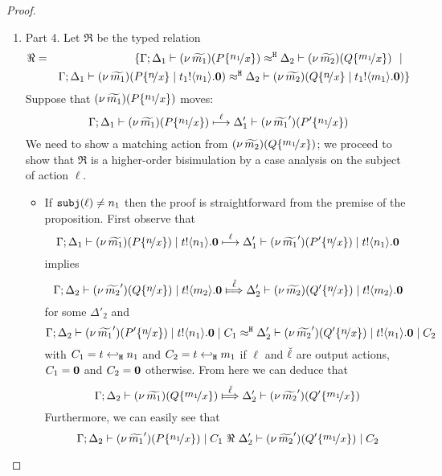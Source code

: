 \begin{proof}
\begin{enumerate}[1.]
		\item	Part 4. Let $\Re$ be the typed relation
				\begin{eqnarray*}
					\Re &=& \set{	\horel{\Gamma}{\Delta_1}{ \newsp{\widetilde{m_1}}{P \subst{n_1}{x} }}
									{\hwb}
									{\Delta_2}{ \newsp{\widetilde{m_2}}{Q \subst{m_1}{x} }} \setbar \\
						&&
									\horel{\Gamma}{\Delta_1}{ \newsp{\widetilde{m_1}}{P \subst{n}{x} \Par \bout{t_1}{n_1} \inact }}
									{\hwb}
									{\Delta_2}{ \newsp{\widetilde{m_2}}{Q \subst{n}{x} \Par \bout{t_1}{m_1} \inact }}
					}
				\end{eqnarray*}
				Suppose that $\newsp{\widetilde{m_1}}{P \subst{n_1}{x}}$ moves:
				\[
					\horel{\Gamma}{\Delta_1}{\newsp{\widetilde{m_1}}{P \subst{n_1}{x}}}
					{\hby{\ell}}
					{\Delta_1'}{\newsp{\widetilde{m_1}'}{P' \subst{n_1}{x}}}
				\]
				We need to show a matching action from $\newsp{\widetilde{m_2}}{Q \subst{m_1}{x}}$;
				we proceed to show that $\Re$ is a higher-order bisimulation by a case analysis on the subject of action $\ell$.
				\begin{itemize}
					\item	If $\mathtt{subj}(\ell) \not= n_1$ then the proof is straightforward from the premise of the proposition.
							First observe that
							\[
								\horel{\Gamma}{\Delta_1}{\newsp{\widetilde{m_1}}{P \subst{n}{x}} \Par \bout{t}{n_1} \inact}
								{\hby{\ell}}
								{\Delta_1'}{\newsp{\widetilde{m_1}'}{P' \subst{n}{x}} \Par \bout{t}{n_1} \inact}
							\]
							implies
							\[
								\horel{\Gamma}{\Delta_2}{\newsp{\widetilde{m_2}'}{Q \subst{n}{x}} \Par \bout{t}{m_2} \inact}
								{\Hby{\mact{\ell}}}
								{\Delta_2'}{\newsp{\widetilde{m_2}}{Q' \subst{n}{x}} \Par \bout{t}{m_2} \inact}
							\]
							for some $\Delta'_2$
							and
							\[
								\horel{\Gamma}{\Delta_2}{\newsp{\widetilde{m_1}'}{P' \subst{n}{x}} \Par \bout{t}{n_1} \inact \Par C_1}
								{\hwb}
								{\Delta_2'}{\newsp{\widetilde{m_2}'}{Q' \subst{n}{x}} \Par \bout{t}{n_1} \inact \Par C_2}
							\]
							with $C_1 = t \hookleftarrow_{\mathtt{H}} n_1$ and $C_2 = t \hookleftarrow_{\mathtt{H}} m_1$ if $\ell$ and $\breve{\ell}$ are output actions,
							$C_1 = \mathbf{0}$ and $C_2 = \mathbf{0}$ otherwise.
							From here we can deduce that 
							\[
								\horel{\Gamma}{\Delta_2}{\newsp{\widetilde{m_1}}{Q \subst{m_1}{x}}}
								{\Hby{\mact{\ell}}}
								{\Delta_2'}{\newsp{\widetilde{m_2}'}{Q' \subst{m_1}{x}}}
							\]
							Furthermore, we can easily see that
							\[
								\horel{\Gamma}{\Delta_2}{\newsp{\widetilde{m_1}'}{P \subst{n_1}{x}} \Par C_1}
								{\ \Re\ }
								{\Delta_2'}{\newsp{\widetilde{m_2}'}{Q' \subst{m_1}{x}} \Par C_2}
							\]


\end{itemize}
\end{enumerate}
\end{proof}
